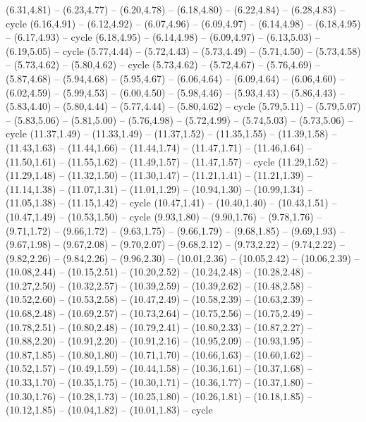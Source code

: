 \expandafter\def\csname geo:gebiet:CHE\endcsname{
  (6.31,4.81) -- (6.23,4.77) -- (6.20,4.78) -- (6.18,4.80) -- (6.22,4.84) -- (6.28,4.83) -- cycle}
\expandafter\def\csname geo:gebiet:LUX\endcsname{
  }
\expandafter\def\csname geo:gebiet:BEL\endcsname{
  (6.16,4.91) -- (6.12,4.92) -- (6.07,4.96) -- (6.09,4.97) -- (6.14,4.98) -- (6.18,4.95) -- (6.17,4.93) -- cycle}
\expandafter\def\csname geo:gebiet:NLD\endcsname{
  (6.18,4.95) -- (6.14,4.98) -- (6.09,4.97) -- (6.13,5.03) -- (6.19,5.05) -- cycle}
\expandafter\def\csname geo:gebiet:PRT\endcsname{
  (5.77,4.44) -- (5.72,4.43) -- (5.73,4.49) -- (5.71,4.50) -- (5.73,4.58) -- (5.73,4.62) -- (5.80,4.62) -- cycle}
\expandafter\def\csname geo:gebiet:ESP\endcsname{
  (5.73,4.62) -- (5.72,4.67) -- (5.76,4.69) -- (5.87,4.68) -- (5.94,4.68) -- (5.95,4.67) -- (6.06,4.64) -- (6.09,4.64) -- (6.06,4.60) -- (6.02,4.59) -- (5.99,4.53) -- (6.00,4.50) -- (5.98,4.46) -- (5.93,4.43) -- (5.86,4.43) -- (5.83,4.40) -- (5.80,4.44) -- (5.77,4.44) -- (5.80,4.62) -- cycle}
\expandafter\def\csname geo:gebiet:IRL\endcsname{
  (5.79,5.11) -- (5.79,5.07) -- (5.83,5.06) -- (5.81,5.00) -- (5.76,4.98) -- (5.72,4.99) -- (5.74,5.03) -- (5.73,5.06) -- cycle}
\expandafter\def\csname geo:gebiet:NCL\endcsname{
  }
\expandafter\def\csname geo:gebiet:SLB\endcsname{
  }
\expandafter\def\csname geo:gebiet:NZL\endcsname{
  (11.37,1.49) -- (11.33,1.49) -- (11.37,1.52) -- (11.35,1.55) -- (11.39,1.58) -- (11.43,1.63) -- (11.44,1.66) -- (11.44,1.74) -- (11.47,1.71) -- (11.46,1.64) -- (11.50,1.61) -- (11.55,1.62) -- (11.49,1.57) -- (11.47,1.57) -- cycle
  (11.29,1.52) -- (11.29,1.48) -- (11.32,1.50) -- (11.30,1.47) -- (11.21,1.41) -- (11.21,1.39) -- (11.14,1.38) -- (11.07,1.31) -- (11.01,1.29) -- (10.94,1.30) -- (10.99,1.34) -- (11.05,1.38) -- (11.15,1.42) -- cycle}
\expandafter\def\csname geo:gebiet:AUS\endcsname{
  (10.47,1.41) -- (10.40,1.40) -- (10.43,1.51) -- (10.47,1.49) -- (10.53,1.50) -- cycle
  (9.93,1.80) -- (9.90,1.76) -- (9.78,1.76) -- (9.71,1.72) -- (9.66,1.72) -- (9.63,1.75) -- (9.66,1.79) -- (9.68,1.85) -- (9.69,1.93) -- (9.67,1.98) -- (9.67,2.08) -- (9.70,2.07) -- (9.68,2.12) -- (9.73,2.22) -- (9.74,2.22) -- (9.82,2.26) -- (9.84,2.26) -- (9.96,2.30) -- (10.01,2.36) -- (10.05,2.42) -- (10.06,2.39) -- (10.08,2.44) -- (10.15,2.51) -- (10.20,2.52) -- (10.24,2.48) -- (10.28,2.48) -- (10.27,2.50) -- (10.32,2.57) -- (10.39,2.59) -- (10.39,2.62) -- (10.48,2.58) -- (10.52,2.60) -- (10.53,2.58) -- (10.47,2.49) -- (10.58,2.39) -- (10.63,2.39) -- (10.68,2.48) -- (10.69,2.57) -- (10.73,2.64) -- (10.75,2.56) -- (10.75,2.49) -- (10.78,2.51) -- (10.80,2.48) -- (10.79,2.41) -- (10.80,2.33) -- (10.87,2.27) -- (10.88,2.20) -- (10.91,2.20) -- (10.91,2.16) -- (10.95,2.09) -- (10.93,1.95) -- (10.87,1.85) -- (10.80,1.80) -- (10.71,1.70) -- (10.66,1.63) -- (10.60,1.62) -- (10.52,1.57) -- (10.49,1.59) -- (10.44,1.58) -- (10.36,1.61) -- (10.37,1.68) -- (10.33,1.70) -- (10.35,1.75) -- (10.30,1.71) -- (10.36,1.77) -- (10.37,1.80) -- (10.30,1.76) -- (10.28,1.73) -- (10.25,1.80) -- (10.26,1.81) -- (10.18,1.85) -- (10.12,1.85) -- (10.04,1.82) -- (10.01,1.83) -- cycle}
